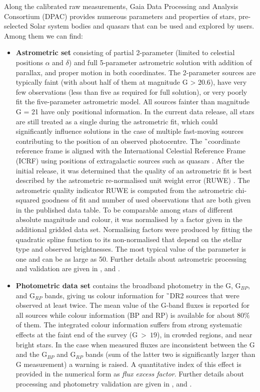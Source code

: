 Along the calibrated raw measurements, Gaia Data Processing and Analysis Consortium (DPAC) provides numerous parameters and properties of stars, pre-selected Solar system bodies and quasars that can be used and explored by users. Among them we can find:
\begin{itemize}
	\item \textbf{Astrometric set} consisting of partial 2-parameter (limited to celestial positions $\alpha$ and $\delta$) and full 5-parameter astrometric solution with addition of parallax, and proper motion in both coordinates. The 2-parameter sources are typically faint (with about half of them at magnitude G > 20.6), have very few observations (less than five as required for full solution), or very poorly fit the five-parameter astrometric model. All sources fainter than magnitude G = 21 have only positional information. In the current data release, all stars are still treated as a single during the astrometric fit, which could significantly influence solutions in the case of multiple fast-moving sources contributing to the position of an observed photocentre. The \G\ coordinate reference frame is aligned with the International Celestial Reference Frame (ICRF) using positions of extragalactic sources such as quasars \cite{2018A&A...616A..14G}. After the initial release, it was determined that the quality of an astrometric fit is best described by the astrometric re-normalised unit weight error (RUWE) \cite{ruwe}. The astrometric quality indicator RUWE is computed from the astrometric chi-squared goodness of fit and number of used observations that are both given in the published data table. To be comparable among stars of different absolute magnitude and colour, it was normalised by a factor given in the additional gridded data set. Normalising factors were produced by fitting the quadratic spline function to its non-normalised that depend on the stellar type and observed brightnesses. The most typical value of the parameter is one and can be as large as 50. Further details about astrometric processing and validation are given in \citet{2018A&A...616A...2L}, and \cite{2018A&A...616A...9L}.
	
	\item \textbf{Photometric data set} contains the broadband photometry in the G, G$_{BP}$, and G$_{RP}$ bands, giving us colour information for \G\ DR2 sources that were observed at least twice. The mean value of the G-band fluxes is reported for all sources while colour information (BP and RP) is available for about 80$\%$ of them.  The integrated colour information suffers from strong systematic effects at the faint end of the survey (G~>~$19$), in crowded regions, and near bright stars. In the case when measured fluxes are inconsistent between the G and the G$_{BP}$ and G$_{RP}$ bands (sum of the latter two is significantly larger than G measurement) a warning is raised. A quantitative index of this effect is provided in the numerical form as \textit{flux excess factor}. Further details about processing and photometry validation are given in \citet{2018arXiv180409368E}, and \cite{2018A&A...616A...3R}.
	

\end{itemize}
